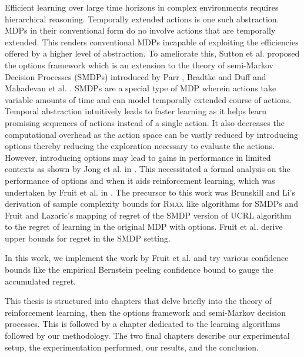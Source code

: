 Efficient learning over large time horizons in complex environments requires hierarchical reasoning.
Temporally extended actions is one such abstraction.
MDPs in their conventional form do no involve actions that are temporally extended.
This renders conventional MDPs incapable of exploiting the efficiencies offered by a higher level of abstraction.
To ameliorate this, Sutton et al. proposed the options framework \cite{sutton_between_1999} which is an extension to the theory of semi-Markov Decision Processes (SMDPs) introduced by Parr \cite{parr_reinforcement_nodate}, Bradtke and Duff \cite{bradtke_reinforcement_1995} and Mahadevan et al. \cite{mahadevan_self-improving_1997}.
SMDPs are a special type of MDP wherein actions take variable amounts of time and can model temporally extended course of actions.
Temporal abstraction intuitively leads to faster learning as it helps learn promising sequences of actions instead of a single action.
It also decreases the computational overhead as the action space can be vastly reduced by introducing options thereby reducing the exploration necessary to evaluate the actions.
However, introducing options may lead to gains in performance in limited contexts as shown by Jong et al. in \cite{jong_utility_2008}.
This necessitated a formal analysis on the performance of options and when it aids reinforcement learning, which was undertaken by Fruit et al. in \cite{fruit_exploration--exploitation_2017}. 
The precursor to this work was Brunskill and Li's \cite{brunskill_pac-inspired_2014} derivation of sample complexity bounds for R\textsc{max} like algorithms for SMDPs and Fruit and Lazaric's \cite{fruit_exploration--exploitation_2017} mapping of regret of the SMDP version of UCRL algorithm to the regret of learning in the original MDP with options.
Fruit et al. \cite{fruit_exploration--exploitation_2017} derive upper bounds for regret in the SMDP setting.

In this work, we implement the work by Fruit et al.\cite{fruit_exploration--exploitation_2017} and try various confidence bounds like the empirical Bernstein peeling confidence bound to gauge the accumulated regret.

This thesis is structured into chapters that delve briefly into the theory of reinforcement learning, then the options framework and semi-Markov decision processes.
This is followed by a chapter dedicated to the learning algorithms followed by our methodology.
The two final chapters describe our experimental setup, the experimentation performed, our results, and the conclusion.


\newpage
